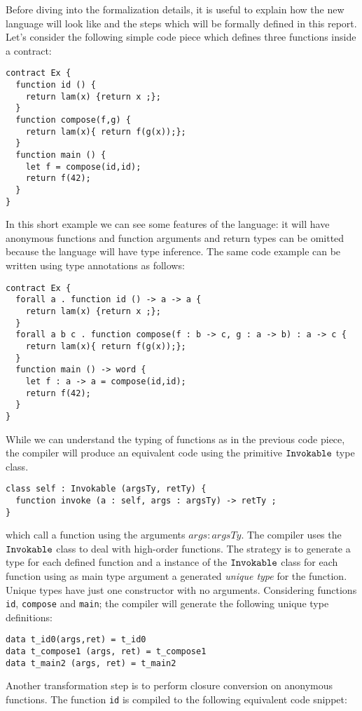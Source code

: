 \documentclass[a4paper, 11pt]{article}
\begin{document}
Before diving into the formalization details, it 
is useful to explain how the new language will look like 
and the steps which will be formally defined in this 
report. Let's consider the following simple code 
piece which defines three functions inside a contract:

\begin{lstlisting}[language=solidity]
contract Ex {
  function id () {
    return lam(x) {return x ;};
  }
  function compose(f,g) {
    return lam(x){ return f(g(x));};
  }
  function main () {
    let f = compose(id,id);
    return f(42);
  }
}
\end{lstlisting}

In this short example we can see some features of the \solidity 
language: it will have anonymous functions and 
function arguments and return types can be omitted because 
the language will have type inference. The same code 
example can be written using type annotations as follows:

\begin{lstlisting}[language=solidity]
contract Ex {
  forall a . function id () -> a -> a {
    return lam(x) {return x ;};
  }
  forall a b c . function compose(f : b -> c, g : a -> b) : a -> c {
    return lam(x){ return f(g(x));};
  }
  function main () -> word {
    let f : a -> a = compose(id,id);
    return f(42);
  }
}
\end{lstlisting}

While we can understand the typing of functions as in the previous
code piece, the \solidity compiler will produce an equivalent 
code using the primitive $\mathtt{Invokable}$ type class. 

\begin{lstlisting}[language=solidity]
class self : Invokable (argsTy, retTy) {
  function invoke (a : self, args : argsTy) -> retTy ;
}
\end{lstlisting}
which call a function using the arguments $args : argsTy$. The compiler 
uses the $\mathtt{Invokable}$ class to deal with high-order functions. The 
strategy is to generate a type for each defined function and a 
instance of the $\mathtt{Invokable}$ class for each function using as main 
type argument a generated \emph{unique type} for the function. 
Unique types have just one constructor with no arguments. Considering 
functions \texttt{id}, \texttt{compose} and \texttt{main}; the compiler 
will generate the following unique type definitions:

\begin{lstlisting}[language=solidity]
data t_id0(args,ret) = t_id0 
data t_compose1 (args, ret) = t_compose1
data t_main2 (args, ret) = t_main2 
\end{lstlisting}
Another transformation step is to perform closure conversion on 
anonymous functions. The function \texttt{id} is compiled to 
the following equivalent code snippet:
\end{document}
